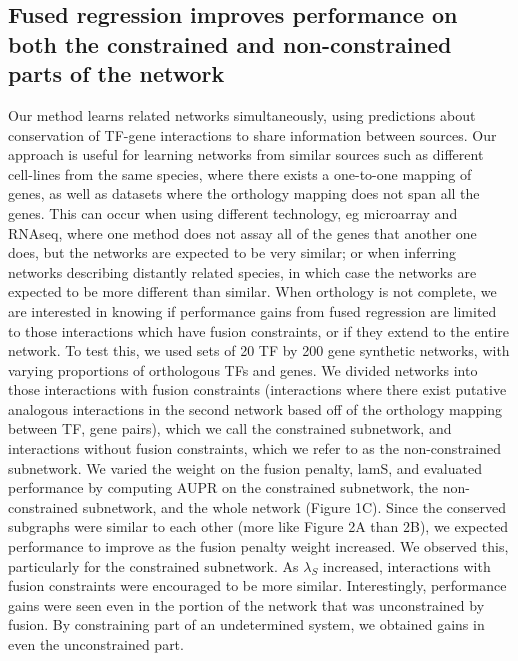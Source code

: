 \documentclass[11pt]{article}
\begin{document}
\subsection{Fused regression improves performance on both the constrained and non-constrained parts of the network}
Our method learns related networks simultaneously, using predictions about conservation of TF-gene interactions to share information between sources. Our approach is useful for learning networks from similar sources such as different cell-lines from the same species, where there exists a one-to-one mapping of genes, as well as datasets where the orthology mapping does not span all the genes. This can occur when using different technology, eg microarray and RNAseq, where one method does not assay all of the genes that another one does, but the networks are expected to be very similar; or when inferring networks describing distantly related species, in which case the networks are expected to be more different than similar. When orthology is not complete, we are interested in knowing if performance gains from fused regression are limited to those interactions which have fusion constraints, or if they extend to the entire network. To test this, we used sets of 20 TF by 200 gene synthetic networks, with varying proportions of orthologous TFs and genes. We divided networks into those interactions with fusion constraints (interactions where there exist putative analogous interactions in the second network based off of the orthology mapping between TF, gene pairs), which we call the constrained subnetwork, and interactions without fusion constraints, which we refer to as the non-constrained subnetwork. We varied the weight on the fusion penalty, lamS, and evaluated performance by computing AUPR on the constrained subnetwork, the non-constrained subnetwork, and the whole network (Figure 1C). Since the conserved subgraphs were similar to each other (more like Figure 2A than 2B), we expected performance to improve as the fusion penalty weight increased. We observed this, particularly for the constrained subnetwork. As $\lambda_S$ increased, interactions with fusion constraints were encouraged to be more similar. Interestingly, performance gains were seen even in the portion of the network that was unconstrained by fusion. By constraining part of an undetermined system, we obtained gains in even the unconstrained part. 
\end{document}
